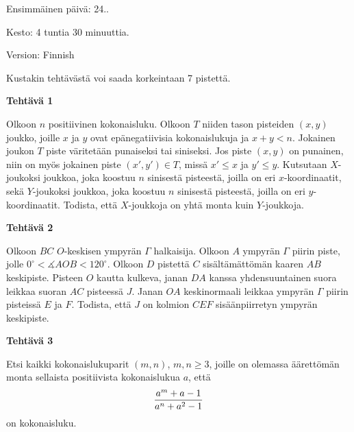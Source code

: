 \documentclass[a4paper,12pt,fleqn]{article}
\begin{document}
\vspace*{4.5cm}

\begin{center}
Ensimm\"ainen p\"aiv\"a: 24..
\end{center}

\vspace*{1cm}
Kesto: 4 tuntia 30 minuuttia.

\vspace*{-4.5\parskip}
\begin{flushright}
Version: Finnish
\end{flushright}

\vspace*{-1.9\parskip}
Kustakin teht\"av\"ast\"a voi saada korkeintaan  7 pistett\"a.


\vspace*{7mm}
{\bf Teht\"av\"a 1}

Olkoon $n$ positiivinen kokonaisluku.  Olkoon $T$ niiden tason
pisteiden $(x,y)$ joukko, 
joille $x$ ja $y$ ovat ep\"anegatiivisia kokonaislukuja
ja $x+y<n$.  Jokainen joukon $T$ piste v\"aritet\"a\"an punaiseksi tai
siniseksi.  Jos piste $(x,y)$ on punainen, niin on my\"os jokainen
piste $(x',y')\in T$, miss\"a $x'\le x$ ja $y'\le y$. Kutsutaan 
$X$-joukoksi joukkoa, joka koostuu $n$ sinisest\"a pisteest\"a, 
joilla on eri $x$-koordinaatit, sek\"a
$Y$-joukoksi joukkoa, joka koostuu $n$ sinisest\"a pisteest\"a, 
joilla on eri $y$-koordinaatit.  Todista, ett\"a $X$-joukkoja on yht\"a monta
kuin $Y$-joukkoja.

\vspace*{7mm}
{\bf Teht\"av\"a 2}

Olkoon $BC$ \quad $O$-keskisen ympyr\"an $\Gamma$ halkaisija.
Olkoon $A$ ympyr\"an $\Gamma$ piirin 
piste, jolle $0^\circ<\measuredangle AOB<120^\circ$.
Olkoon $D$ pistett\"a $C$ sis\"alt\"am\"att\"om\"an kaaren $AB$ keskipiste.
Pisteen $O$ kautta kulkeva, janan $DA$ kanssa yhdensuuntainen suora
leikkaa suoran $AC$ pisteess\"a $J$.  Janan $OA$ keskinormaali
leikkaa ympyr\"an $\Gamma$ piirin pisteiss\"a $E$ ja $F$.  Todista, ett\"a $J$
on kolmion $CEF$ sis\"a\"anpiirretyn ympyr\"an keskipiste. 

\vspace*{7mm}
{\bf Teht\"av\"a 3}

Etsi kaikki  kokonaislukuparit $(m,n)$, $m,n\ge 3$, joille on
olemassa \"a\"arett\"om\"an monta sellaista positiivista
kokonaislukua $a$, ett\"a
   $${a^m+a-1\over a^n+a^2-1}$$
on kokonaisluku.
\end{document}
